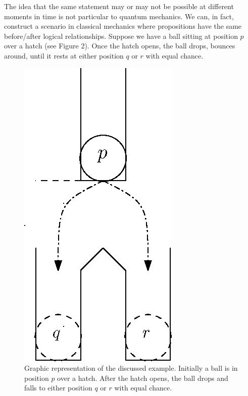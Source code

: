 \documentclass[11pt, executivepaper]{article}
\begin{document}
The idea that the same statement may or may not be possible at different moments in time is not particular to quantum mechanics. We can, in fact, construct a scenario in classical mechanics where propositions have the same before/after logical relationships. Suppose we have a ball sitting at position $p$ over a hatch (see Figure 2). Once the hatch opens, the ball drops, bounces around, until it rests at either position $q$ or $r$ with equal chance.

\begin{figure}

\begin{center}
\includegraphics[scale=.8]{Ball.eps}
\end{center}
\caption{\small{Graphic representation of the discussed example.  Initially a ball is in position $p$ over a hatch.  After the hatch opens, the ball drops and falls to either position $q$ or $r$ with equal chance.}}
\end{figure}
\end{document}
